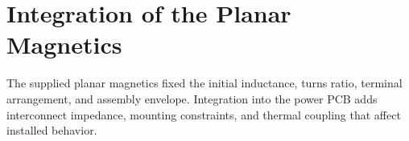 \chapter{Integration of the Planar Magnetics}
\label{ch:magnetics}

The supplied planar magnetics fixed the initial inductance, turns ratio, terminal arrangement, and assembly envelope. Integration into the power PCB adds interconnect impedance, mounting constraints, and thermal coupling that affect installed behavior.














